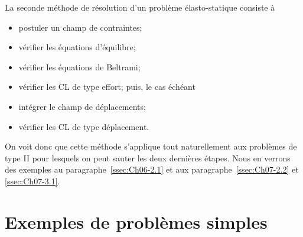 La seconde méthode de résolution d'un problème élasto-statique consiste à 
\begin{itemize}
    \item postuler un champ de contraintes;
    \item vérifier les équations d'équilibre;
    \item vérifier les équations de Beltrami;
    \item vérifier les CL de type effort;
puis, le cas échéant 
\end{itemize}
\begin{itemize}
    \item intégrer le champ de déplacements;
    \item  vérifier les CL de type déplacement.
\end{itemize}
On voit donc que cette méthode s'applique tout naturellement aux problèmes de type II pour lesquels on peut sauter les deux dernières étapes.
Nous en verrons des exemples au paragraphe~\ref{ssec:Ch06-2.1} et aux paragraphe~\ref{ssec:Ch07-2.2} et \ref{ssec:Ch07-3.1}.

\section{Exemples de problèmes simples}
\endinput
Comme premier exemple, on peut citer le problème de la compression d'un lopin avec CL de non frottement, qui a été résolu de manière tout à fait générale au § IV.I.3  Nous allons traiter deux autres exemples tirés du § IV. 1  
2.1 DEFORMATION D'UN BLOC PESANT 
:lt~ 


